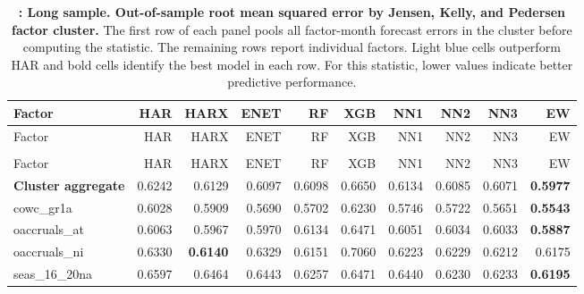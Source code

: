 \begingroup\scriptsize
\captionsetup{justification=raggedright,labelsep=none,singlelinecheck=false,labelformat=boldlabel}
\setlength{\tabcolsep}{2.5pt}
\begin{longtable}{>{\raggedright\arraybackslash}p{2.6cm}rrrrrrrrr}
\caption[Out-of-sample root mean squared error by Jensen, Kelly, and Pedersen factor cluster.]{\footnotesize \textbf{: Long sample. Out-of-sample root mean squared error by Jensen, Kelly, and Pedersen factor cluster.} The first row of each panel pools all factor-month forecast errors in the cluster before computing the statistic. The remaining rows report individual factors. Light blue cells outperform HAR and bold cells identify the best model in each row. For this statistic, lower values indicate better predictive performance.}\label{tab:rv-factor_rmse}\\
\hline
Factor & HAR & HARX & ENET & RF & XGB & NN1 & NN2 & NN3 & EW \\
\hline\endfirsthead
\hline
Factor & HAR & HARX & ENET & RF & XGB & NN1 & NN2 & NN3 & EW \\
\hline\endhead
\hline\endfoot
\multicolumn{10}{@{}l}{\textit{Panel A. Accruals}} \\
\hline
Factor & HAR & HARX & ENET & RF & XGB & NN1 & NN2 & NN3 & EW \\
\hline
\textbf{Cluster aggregate} & 0.6242 & \cellcolor{blue!10}0.6129 & \cellcolor{blue!10}0.6097 & \cellcolor{blue!10}0.6098 & 0.6650 & \cellcolor{blue!10}0.6134 & \cellcolor{blue!10}0.6085 & \cellcolor{blue!10}0.6071 & \textbf{\cellcolor{blue!10}0.5977} \\
cowc\_gr1a & 0.6028 & \cellcolor{blue!10}0.5909 & \cellcolor{blue!10}0.5690 & \cellcolor{blue!10}0.5702 & 0.6230 & \cellcolor{blue!10}0.5746 & \cellcolor{blue!10}0.5722 & \cellcolor{blue!10}0.5651 & \textbf{\cellcolor{blue!10}0.5543} \\
oaccruals\_at & 0.6063 & \cellcolor{blue!10}0.5967 & \cellcolor{blue!10}0.5970 & 0.6134 & 0.6471 & \cellcolor{blue!10}0.6051 & \cellcolor{blue!10}0.6034 & \cellcolor{blue!10}0.6033 & \textbf{\cellcolor{blue!10}0.5887} \\
oaccruals\_ni & 0.6330 & \textbf{\cellcolor{blue!10}0.6140} & \cellcolor{blue!10}0.6329 & \cellcolor{blue!10}0.6151 & 0.7060 & \cellcolor{blue!10}0.6223 & \cellcolor{blue!10}0.6229 & \cellcolor{blue!10}0.6212 & \cellcolor{blue!10}0.6175 \\
seas\_16\_20na & 0.6597 & \cellcolor{blue!10}0.6464 & \cellcolor{blue!10}0.6443 & \cellcolor{blue!10}0.6257 & \cellcolor{blue!10}0.6471 & \cellcolor{blue!10}0.6440 & \cellcolor{blue!10}0.6230 & \cellcolor{blue!10}0.6233 & \textbf{\cellcolor{blue!10}0.6195} \\

\end{longtable}

